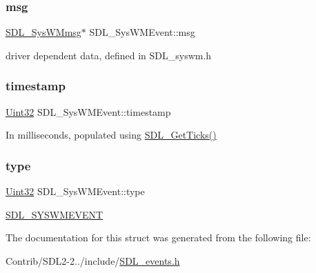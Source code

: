 \subsubsection{\texorpdfstring{msg}{msg}}
{\footnotesize\ttfamily \mbox{\hyperlink{struct_s_d_l___sys_w_mmsg}{S\+D\+L\+\_\+\+Sys\+W\+Mmsg}}$\ast$ S\+D\+L\+\_\+\+Sys\+W\+M\+Event\+::msg}

driver dependent data, defined in S\+D\+L\+\_\+syswm.\+h \mbox{\label{struct_s_d_l___sys_w_m_event_a5d3cb97006d99b620c2671c27bd82c06}} 
\subsubsection{\texorpdfstring{timestamp}{timestamp}}
{\footnotesize\ttfamily \mbox{\hyperlink{_s_d_l__stdinc_8h_add440eff171ea5f55cb00c4a9ab8672d}{Uint32}} S\+D\+L\+\_\+\+Sys\+W\+M\+Event\+::timestamp}

In milliseconds, populated using \mbox{\hyperlink{_s_d_l__timer_8h_a0b9bc71d6287e0ffafdc3419760fe2b3}{S\+D\+L\+\_\+\+Get\+Ticks()}} \mbox{\label{struct_s_d_l___sys_w_m_event_a84697e96cb16bf6a570e10b5bfdcd392}} 
\subsubsection{\texorpdfstring{type}{type}}
{\footnotesize\ttfamily \mbox{\hyperlink{_s_d_l__stdinc_8h_add440eff171ea5f55cb00c4a9ab8672d}{Uint32}} S\+D\+L\+\_\+\+Sys\+W\+M\+Event\+::type}

\mbox{\hyperlink{_s_d_l__events_8h_a3b589e89be6b35c02e0dd34a55f3fccaa73749d735a18ce6ef17a09ee70d5dbe7}{S\+D\+L\+\_\+\+S\+Y\+S\+W\+M\+E\+V\+E\+NT}} 

The documentation for this struct was generated from the following file\+:\begin{DoxyCompactItemize}
\item 
Contrib/\+S\+D\+L2-\/2../include/\mbox{\hyperlink{_s_d_l__events_8h}{S\+D\+L\+\_\+events.\+h}}\end{DoxyCompactItemize}
